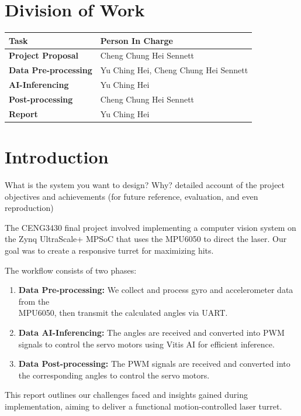 \documentclass[12pt, a4paper]{article}
\begin{document}
\setcounter{page}{2}

\tableofcontents

\section*{Division of Work}
\begin{tabularx}{\textwidth}{|l||X|}
    \hline
    \textbf{Task} & \textbf{Person In Charge} \\
    \hline\hline
    \textbf{Project Proposal} & Cheng Chung Hei Sennett \\
    \hline
    \textbf{Data Pre-processing} & Yu Ching Hei, Cheng Chung Hei Sennett \\
    \hline
    \textbf{AI-Inferencing} & Yu Ching Hei \\
    \hline
    \textbf{Post-processing} & Cheng Chung Hei Sennett \\
    \hline
    \textbf{Report} & Yu Ching Hei \\
    \hline
\end{tabularx}

\newpage
{}
\setcounter{page}{1}

\section{Introduction}
What is the system you want to design? Why?
detailed account of the project objectives
and achievements (for future reference, evaluation, and even
reproduction)

The CENG3430 final project involved implementing a computer vision system on the Zynq UltraScale+ MPSoC \cite{zynq_ultrascale_swdev}
that uses the MPU6050 to direct the laser. Our goal was to create a responsive turret for maximizing hits.

\noindent The workflow consists of two phases:
\begin{enumerate}
    \item \textbf{Data Pre-processing:} We collect and process gyro and accelerometer 
          data from the \\MPU6050, then transmit the calculated angles via UART.
    \item \textbf{Data AI-Inferencing:} The angles are received and converted into PWM 
          signals to control the servo motors using Vitis AI \cite{vitis_ai_docs} for efficient inference.
    \item \textbf{Data Post-processing:} The PWM signals are received and converted into 
          the corresponding angles to control the servo motors.
\end{enumerate}
This report outlines our challenges faced and insights gained during implementation, aiming to deliver a functional motion-controlled laser turret.
\end{document}
